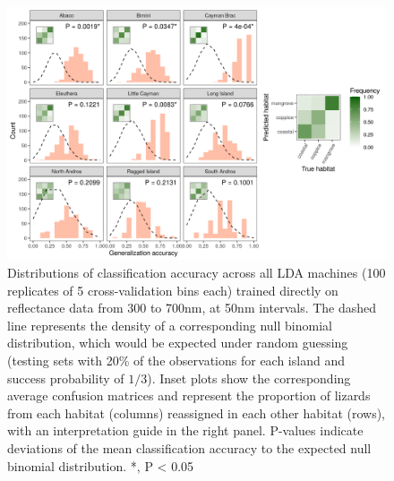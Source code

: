 \begin{figure}[H]
    \centering
	\includegraphics[width=\textwidth]{../analyses/04-machine learning/plots/classif_lda_refl.png}
	\caption{Distributions of classification accuracy across all LDA machines (100 replicates of 5 cross-validation bins each) trained directly on reflectance data from 300 to 700nm, at 50nm intervals. The dashed line represents the density of a corresponding null binomial distribution, which would be expected under random guessing (testing sets with 20\% of the observations for each island and success probability of $1/3$). Inset plots show the corresponding average confusion matrices and represent the proportion of lizards from each habitat (columns) reassigned in each other habitat (rows), with an interpretation guide in the right panel. P-values indicate deviations of the mean classification accuracy to the expected null binomial distribution. *, P < 0.05}
	\label{supfig:classif_lda_refl}
\end{figure}